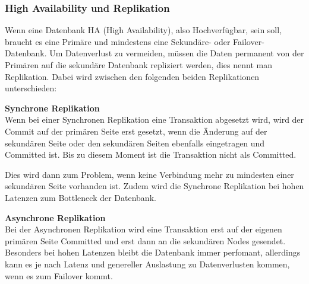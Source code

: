 
\subsubsection{High Availability und Replikation}
\begin{flushleft}
    Wenn eine Datenbank HA (High Availability), also Hochverfügbar, sein soll, braucht es eine Primäre und mindestens eine Sekundäre- oder \Gls{Failover}-Datenbank.
    Um Datenverlust zu vermeiden, müssen die Daten permanent von der Primären auf die sekundäre Datenbank repliziert werden, dies nennt man Replikation\cite{D9RDXENY}.
    Dabei wird zwischen den folgenden beiden Replikationen unterschieden:
\end{flushleft}
\begin{flushleft}
    \textbf{Synchrone Replikation}\\
    Wenn bei einer Synchronen Replikation eine Transaktion abgesetzt wird, wird der Commit auf der primären Seite erst gesetzt, wenn die Änderung auf der sekundären Seite oder den sekundären Seiten ebenfalls eingetragen und Committed ist.
    Bis zu diesem Moment ist die Transaktion nicht als Committed.
    
    Dies wird dann zum Problem, wenn keine Verbindung mehr zu mindesten einer sekundären Seite vorhanden ist.
    Zudem wird die Synchrone Replikation bei hohen Latenzen zum Bottleneck der Datenbank.
\end{flushleft}
\begin{flushleft}
    \textbf{Asynchrone Replikation}\\
    Bei der Asynchronen Replikation wird eine Transaktion erst auf der eigenen primären Seite Committed und erst dann an die sekundären Nodes gesendet.
    Besonders bei hohen Latenzen bleibt die Datenbank immer perfomant, allerdings kann es je nach Latenz und genereller Auslastung zu Datenverlusten kommen, wenn es zum \Gls{Failover} kommt.
\end{flushleft}
